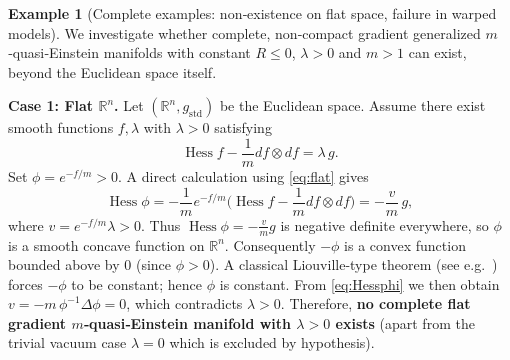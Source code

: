 \documentclass[12pt,a4paper]{article}
\newcommand{\Hess}{\operatorname{Hess}}
\theoremstyle{definition}
\newtheorem{example}[theorem]{Example}
\theoremstyle{definition}
\begin{document}
\begin{example}[Complete examples: non‑existence on flat space, failure in warped models]\label{ex:nonex}
We investigate whether complete, non‑compact gradient generalized $m$‑quasi‑Einstein manifolds with constant $R\le 0$, $\lambda>0$ and $m>1$ can exist, beyond the Euclidean space itself.

\medskip
\noindent\textbf{Case 1: Flat $\mathbb{R}^{n}$.}
Let $(\mathbb{R}^{n}, g_{\text{std}})$ be the Euclidean space.
Assume there exist smooth functions $f,\lambda$ with $\lambda>0$ satisfying
\begin{equation}
\Hess f - \frac1m df\otimes df = \lambda\,g. \label{eq:flat}
\end{equation}
Set $\phi = e^{-f/m} > 0$.
A direct calculation using \eqref{eq:flat} gives
\begin{equation}
\Hess \phi = -\frac{1}{m}e^{-f/m}\bigl(\Hess f - \frac1m df\otimes df\bigr)
= -\frac{v}{m}\,g, \label{eq:Hessphi}
\end{equation}
where $v = e^{-f/m}\lambda > 0$.
Thus $\Hess \phi = -\frac{v}{m}g$ is negative definite everywhere, so $\phi$ is a smooth concave function on $\mathbb{R}^n$.
Consequently $-\phi$ is a convex function bounded above by $0$ (since $\phi>0$).
A classical Liouville-type theorem (see e.g.\ \cite[Theorem~2.1]{Pigola}) forces $-\phi$ to be constant; hence $\phi$ is constant.
From \eqref{eq:Hessphi} we then obtain $v = -m\,\phi^{-1}\Delta\phi = 0$, which contradicts $\lambda>0$.
Therefore, \textbf{no complete flat gradient $m$‑quasi‑Einstein manifold with $\lambda>0$ exists} (apart from the trivial vacuum case $\lambda=0$ which is excluded by hypothesis).


\end{example}
\end{document}
